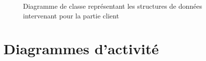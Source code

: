 \documentclass[a4paper]{report}
\begin{document}
\begin{figure}[H]
    \vspace*{-3cm}
    \caption{\label{3} Diagramme de classe représentant les structures de données intervenant pour la partie client}
\end{figure}

\section{Diagrammes d'activité}
\end{document}
